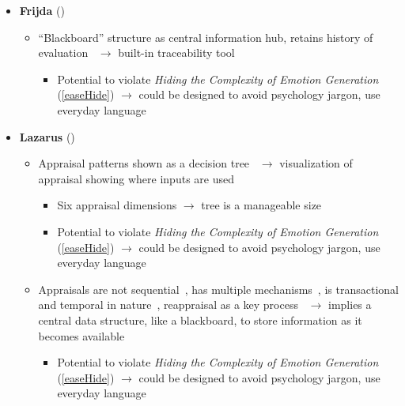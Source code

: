 \begin{itemize}
    \item \textbf{Frijda} (\strong)
    \begin{itemize}
        \item ``Blackboard'' structure as central information hub, retains
        history of evaluation~\citep[p.~459]{frijda1986emotions} $\rightarrow$
        built-in traceability tool
        \begin{itemize}
            \item Potential to violate \textit{Hiding the Complexity of Emotion
                Generation} (\ref{easeHide}) $\rightarrow$ could be designed to
            avoid psychology jargon, use everyday language
        \end{itemize}
    \end{itemize}

    \item \textbf{Lazarus} (\strong)
    \begin{itemize}
        \item Appraisal patterns shown as a decision
        tree~\citep[p.~222]{lazarus1991emotion} $\rightarrow$ visualization of
        appraisal showing where inputs are used
        \begin{itemize}
            \item Six appraisal dimensions $\rightarrow$ tree is a manageable
            size

            \item Potential to violate \textit{Hiding the Complexity of Emotion
                Generation} (\ref{easeHide}) $\rightarrow$ could be designed to
            avoid psychology jargon, use everyday language
        \end{itemize}

        \item Appraisals are not sequential~\citep[p.~151]{lazarus1991emotion},
        has multiple mechanisms~\citep[p.~189]{lazarus1991emotion}, is
        transactional and temporal in
        nature~\citep[p.~210--211]{lazarus1991emotion}, reappraisal as a key
        process~\citep[p.~134]{lazarus1991emotion} $\rightarrow$ implies a
        central data structure, like a blackboard, to store information as it
        becomes available
        \begin{itemize}
            \item Potential to violate \textit{Hiding the Complexity of Emotion
                Generation} (\ref{easeHide}) $\rightarrow$ could be designed to
            avoid psychology jargon, use everyday language
        \end{itemize}
    \end{itemize}


\end{itemize}
